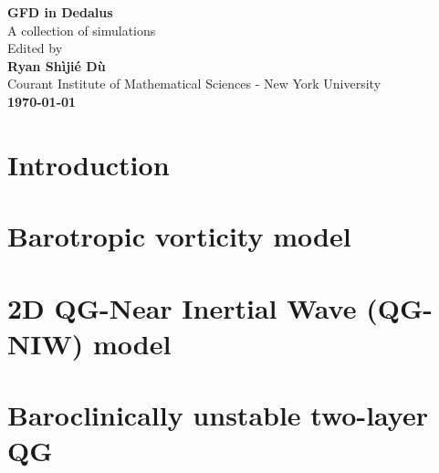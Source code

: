 \documentclass[11pt,letterpaper]{book}
\begin{document}


\begin{titlepage}
    \begin{center}
        \vspace*{4cm}
        \Huge
        \textbf{GFD in Dedalus} \\
        \vspace{0.5cm}
        \LARGE
        {A collection of simulations}\\
        \vspace{3cm}
        Edited by\\
        \vspace{0.5cm}
        \textbf{Ryan Sh\`iji\'e D\`u}\\
        \vspace{0.2cm}
        \normalsize
        {Courant Institute of Mathematical Sciences - New York University}\\
        \vspace{2cm}
        \Large
        \textbf{\today}
        
    \end{center}
\end{titlepage}

\setcounter{tocdepth}{4}
\tableofcontents
\chapter{Introduction}


\chapter{Barotropic vorticity model}\label{chap:Baro_vort}


% 

\chapter{2D QG-Near Inertial Wave (QG-NIW) model}


\chapter{Baroclinically unstable two-layer QG}





\newpage
\printbibliography
\end{document}
